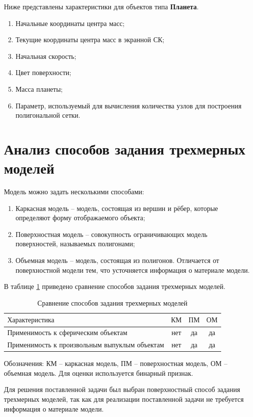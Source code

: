 	\par Ниже представлены характеристики для объектов типа \textbf{Планета}.
	\begin{enumerate}
		\item Начальные координаты центра масс;
		\item Текущие координаты центра масс в экранной СК;
		\item Начальная скорость;
		\item Цвет поверхности;
		\item Масса планеты;
		\item Параметр, используемый для вычисления количества узлов для построения полигональной сетки.
	\end{enumerate}

	\section{Анализ способов задания трехмерных моделей}
	Модель можно задать несколькими способами:
	\begin{enumerate}
		\item Каркасная модель -- модель, состоящая из вершин и рёбер, которые определяют форму отображаемого объекта;
		\item Поверхностная модель -- совокупность ограничивающих модель поверхностей, называемых полигонами;
		\item Объемная модель -- модель, состоящая из полигонов. Отличается от поверхностной модели тем, что усточняется информация о материале модели.
	\end{enumerate}

	В таблице \ref{table:ModelCompare} приведено сравнение способов задания трехмерных моделей.

	 \begin{table}[h!]
            \caption{Сравнение способов задания трехмерных моделей}
            \centering
            \begin{tabular}{|l|c|c|c|}
            \hline
            $\text{Характеристика}$ & $\text{КМ}$ & $\text{ПМ}$ & $\text{ОМ}$\\ \hline
            $\text{Применимость к сферическим объектам}$ & нет & да & да\\ \hline
            $\text{Применимость к произвольным выпуклым объектам}$ & нет & да & да\\ \hline
            
            \end{tabular}
            \label{table:ModelCompare}
    \end{table}
    \par Обозначения: КМ -- каркасная модель, ПМ -- поверхностная модель, ОМ -- объемная модель. Для оценки используется
    бинарный признак.  
    \par Для решения поставленной задачи был выбран поверхностный способ задания трехмерных моделей, так как для реализации поставленной задачи не требуется информация о материале модели.

